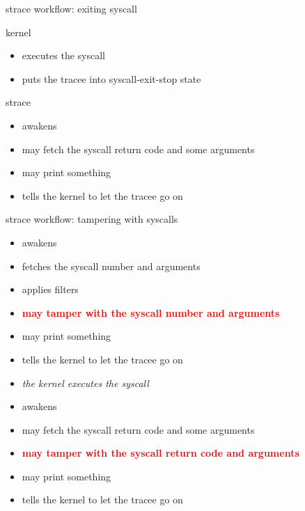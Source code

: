 \documentclass[unicode,aspectratio=169]{beamer}
\begin{document}
\begin{frame}{strace workflow: exiting syscall}
\begin{block}{\large kernel}
\begin{itemize}
	\item executes the syscall
	\item puts the tracee into {\sc syscall-exit-stop} state
\end{itemize}
\end{block}
\begin{block}{\large strace}
\begin{itemize}
	\item awakens
	\item may fetch the syscall return code and some arguments
	\item may print something
	\item tells the kernel to let the tracee go on
\end{itemize}
\end{block}
\end{frame}

\begin{frame}{strace workflow: tampering with syscalls}
\begin{itemize}
	\item awakens
	\item fetches the syscall number and arguments
	\item applies filters
	\item \textcolor{red}{\bf may tamper with the syscall number and arguments}
	\item may print something
	\item tells the kernel to let the tracee go on
	\item {\it the kernel executes the syscall}
	\item awakens
	\item may fetch the syscall return code and some arguments
	\item \textcolor{red}{\bf may tamper with the syscall return code and arguments}
	\item may print something
	\item tells the kernel to let the tracee go on
\end{itemize}
\end{frame}
\end{document}
